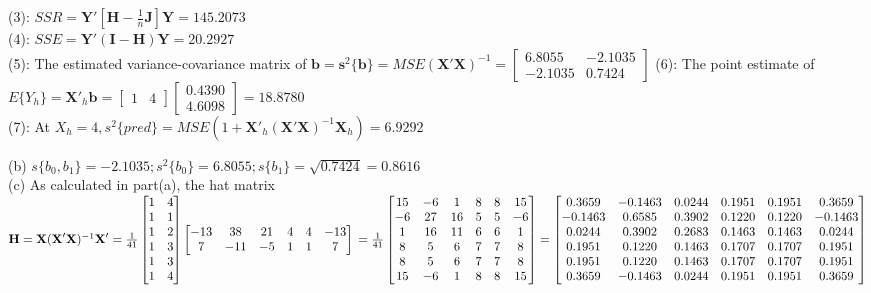 \documentclass[12pt]{article}
\begin{document}
{(3): $SSR=\textbf{Y}'[\textbf{H}-\frac{1}{n}\textbf{J}]\textbf{Y}=145.2073$\\
(4): $SSE=\textbf{Y}'(\textbf{I}-\textbf{H})\textbf{Y}=20.2927$\\
(5): The estimated variance-covariance matrix of $\textbf{b}=\textbf{s}^2\{\textbf{b}\}=MSE(\textbf{X}'\textbf{X})^{-1}
=\begin{bmatrix}6.8055&-2.1035\\-2.1035&0.7424\end{bmatrix}$
(6): The point estimate of $E\{Y_h\}=\textbf{X}'_h\textbf{b}=\begin{bmatrix}1&4\end{bmatrix}\begin{bmatrix}0.4390\\4.6098\end{bmatrix}=18.8780$\\
(7): At $X_h=4, s^2\{pred\}=MSE(1+\textbf{X}'_h(\textbf{X}'\textbf{X})^{-1}\textbf{X}_h)=6.9292$

(b) $s\{b_0,b_1\}=-2.1035; s^2\{b_0\}=6.8055; s\{b_1\}=\sqrt{0.7424}=0.8616$\\

(c) As calculated in part(a), the hat matrix $\textbf{H}=\textbf{X}(\textbf{X}'\textbf{X})^{-1}\textbf{X}'=\frac{1}{41}\begin{bmatrix}1&4\\1&1\\1&2\\1&3\\1&3\\1&4\end{bmatrix}\begin{bmatrix}-13&38&21&4&4&-13\\7&-11&-5&1&1&7\end{bmatrix}\\
=\frac{1}{41}\begin{bmatrix}15&-6&1&8&8&15\\-6&27&16&5&5&-6\\1&16&11&6&6&1\\8&5&6&7&7&8\\8&5&6&7&7&8\\15&-6&1&8&8&15\end{bmatrix}
=\begin{bmatrix}0.3659&-0.1463&0.0244&0.1951&0.1951&0.3659\\-0.1463&0.6585&0.3902&0.1220&0.1220&-0.1463\\
0.0244&0.3902&0.2683&0.1463&0.1463&0.0244\\0.1951&0.1220&0.1463&0.1707&0.1707&0.1951\\
0.1951&0.1220&0.1463&0.1707&0.1707&0.1951\\0.3659&-0.1463&0.0244&0.1951&0.1951&0.3659\end{bmatrix}$\\

}
\end{document}
